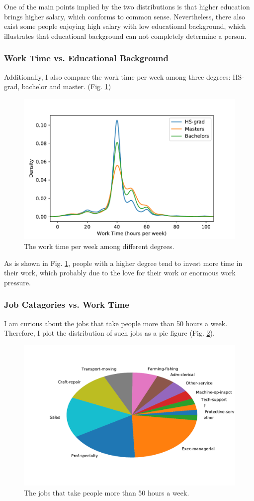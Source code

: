 \documentclass[12pt,a4paper]{article}
\theoremstyle{definition}
\begin{document}
One of the main points implied by the two distributions is that higher education brings higher salary, which conforms to common sense. Nevertheless, there also exist some people enjoying high salary with low educational background, which illustrates that educational background can not completely determine a person.

\subsubsection{Work Time vs. Educational Background}
\label{sec::worktime_vs_edu}
Additionally, I also compare the work time per week among three degrees: HS-grad, bachelor and master. (Fig. \ref{fig::worktime_vs})

\begin{figure}[H]
	\centering
	\includegraphics[width=0.73\linewidth]{img/work_time_com1.pdf}
	\caption{The work time per week among different degrees.}
	\label{fig::worktime_vs}
\end{figure}

As is shown in Fig. \ref{fig::worktime_vs}, people with a higher degree tend to invest more time in their work, which probably due to the love for their work or enormous work pressure.

\subsubsection{Job Catagories vs. Work Time}
\label{sec::job_vs_worktime}
I am curious about the jobs that take people more than 50 hours a week. Therefore, I plot the distribution of such jobs as a pie figure (Fig. \ref{fig::job}).

\begin{figure}[H]
	\centering
	\includegraphics[width=0.75\linewidth]{img/job_dis.pdf}
	\caption{The jobs that take people more than 50 hours a week.}
	\label{fig::job}
\end{figure}
\end{document}
